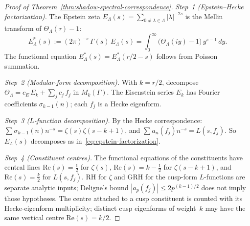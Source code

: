 \begin{proof}[Proof of
Theorem~\textup{\ref{thm:shadow-spectral-correspondence}}]
\mbox{}

\emph{Step~1 (Epstein--Hecke factorization).}
The Epstein zeta $E_\Lambda(s) = \sum_{0\ne\lambda\in\Lambda}
\lvert\lambda\rvert^{-2s}$ is the Mellin transform of
$\Theta_\Lambda(\tau)-1$:
\[
 E_\Lambda^*(s)
 := (2\pi)^{-s}\,\Gamma(s)\,E_\Lambda(s)
 = \int_0^\infty \bigl(\Theta_\Lambda(iy)-1\bigr)\,y^{s-1}\,dy.
\]
The functional equation
$E_\Lambda^*(s)=E_\Lambda^*(r/2-s)$ follows from Poisson summation.

\emph{Step~2 (Modular-form decomposition).}
With $k=r/2$, decompose
$\Theta_\Lambda = c_E\,E_k + \sum_j c_j\,f_j$ in
$M_k(\Gamma)$. The Eisenstein series $E_k$ has Fourier coefficients
$\sigma_{k-1}(n)$; each $f_j$ is a Hecke eigenform.

\emph{Step~3 ($L$-function decomposition).}
By the Hecke correspondence:
$\sum\sigma_{k-1}(n)n^{-s}=\zeta(s)\zeta(s-k+1)$, and
$\sum a_n(f_j)n^{-s}=L(s,f_j)$.
So $E_\Lambda(s)$ decomposes as in~\eqref{eq:epstein-factorization}.

\emph{Step~4 (Constituent centres).}
The functional equations of the constituents have central lines
$\mathrm{Re}(s)=\tfrac12$ for $\zeta(s)$,
$\mathrm{Re}(s)=k-\tfrac12$ for $\zeta(s-k+1)$, and
$\mathrm{Re}(s)=\tfrac{k}{2}$ for $L(s,f_j)$. RH for $\zeta$ and GRH
for the cusp-form $L$-functions are separate analytic inputs; Deligne's
bound $|a_p(f_j)| \leq 2p^{(k-1)/2}$ does not imply those hypotheses.
The centre attached to a cusp constituent is counted with its
Hecke-eigenform multiplicity; distinct cusp eigenforms of weight~$k$
may have the same vertical centre $\mathrm{Re}(s)=k/2$.


\end{proof}
